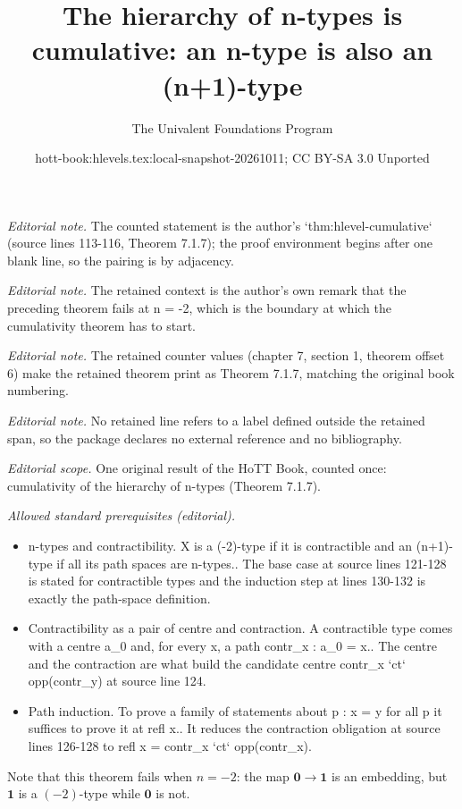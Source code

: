 \documentclass[10pt,a4paper]{article}
\title{The hierarchy of n-types is cumulative: an n-type is also an (n+1)-type}
\author{The Univalent Foundations Program}
\date{hott-book:hlevels.tex:local-snapshot-20261011; CC BY-SA 3.0 Unported}
\newcounter{chapter}
\newcommand{\emptyt}{\ensuremath{\mathbf{0}}\xspace}
\newcommand{\unit}{\ensuremath{\mathbf{1}}\xspace}
\theoremstyle{definition}
\theoremstyle{remark}
\numberwithin{equation}{section}
\begin{document}
\maketitle
\setcounter{chapter}{7}
\setcounter{section}{1}
\setcounter{thm}{6}
\noindent\textit{Editorial note.} The counted statement is the author's `thm:hlevel-cumulative` (source lines 113-116, Theorem 7.1.7); the proof environment begins after one blank line, so the pairing is by adjacency.\par\medskip
\noindent\textit{Editorial note.} The retained context is the author's own remark that the preceding theorem fails at n = -2, which is the boundary at which the cumulativity theorem has to start.\par\medskip
\noindent\textit{Editorial note.} The retained counter values (chapter 7, section 1, theorem offset 6) make the retained theorem print as Theorem 7.1.7, matching the original book numbering.\par\medskip
\noindent\textit{Editorial note.} No retained line refers to a label defined outside the retained span, so the package declares no external reference and no bibliography.\par\medskip
\noindent\textit{Editorial scope.} One original result of the HoTT Book, counted once: cumulativity of the hierarchy of n-types (Theorem 7.1.7).\par\medskip
\noindent\textit{Allowed standard prerequisites (editorial).}\begin{itemize}
\item n-types and contractibility. X is a (-2)-type if it is contractible and an (n+1)-type if all its path spaces are n-types.. The base case at source lines 121-128 is stated for contractible types and the induction step at lines 130-132 is exactly the path-space definition.
\item Contractibility as a pair of centre and contraction. A contractible type comes with a centre a\_0 and, for every x, a path contr\_x : a\_0 = x.. The centre and the contraction are what build the candidate centre contr\_x `ct` opp(contr\_y) at source line 124.
\item Path induction. To prove a family of statements about p : x = y for all p it suffices to prove it at refl x.. It reduces the contraction obligation at source lines 126-128 to refl x = contr\_x `ct` opp(contr\_x).
\end{itemize}\medskip
Note that this theorem fails when $n=-2$: the map $\emptyt \to \unit$ is an embedding, but $\unit$ is a $(-2)$-type while $\emptyt$ is not.
\end{document}
